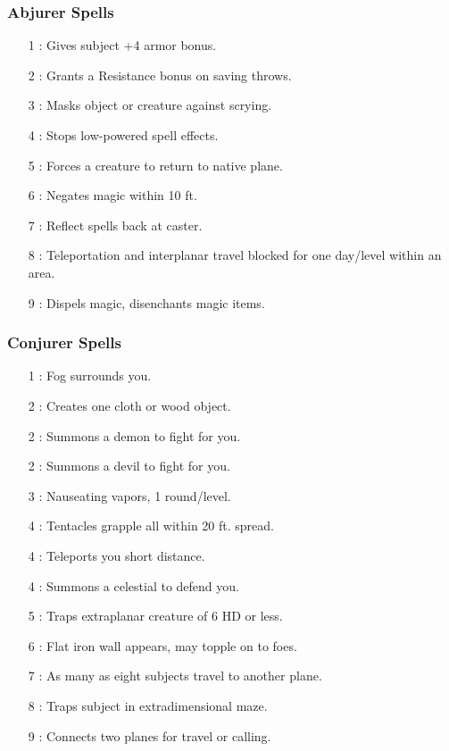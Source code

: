 \subsubsection{Abjurer Spells}
\begin{itemize}
\item[1] : Gives subject +4 armor bonus.
\item[2]  : Grants a Resistance bonus on saving throws.
\item[3] : Masks object or creature against scrying.
\item[4] : Stops low-powered spell effects.
\item[5] : Forces a creature to return to native plane.
\item[6] : Negates magic within 10 ft.
\item[7] : Reflect spells back at caster.
\item[8] : Teleportation and interplanar travel blocked for one day/level within an area.
\item[9] : Dispels magic, disenchants magic items.
\end{itemize}
\subsubsection{Conjurer Spells}
\begin{itemize}
\item[1] : Fog surrounds you.
\item[2] : Creates one cloth or wood object.
\item[2] : Summons a demon to fight for you.
\item[2] : Summons a devil to fight for you.
\item[3] : Nauseating vapors, 1 round/level.
\item[4] : Tentacles grapple all within 20 ft. spread.
\item[4] : Teleports you short distance.
\item[4] : Summons a celestial to defend you.
\item[5] : Traps extraplanar creature of 6 HD or less.
\item[6] : Flat iron wall appears, may topple on to foes.
\item[7] : As many as eight subjects travel to another plane.
\item[8] : Traps subject in extradimensional maze.
\item[9] : Connects two planes for travel or calling.
\end{itemize}
